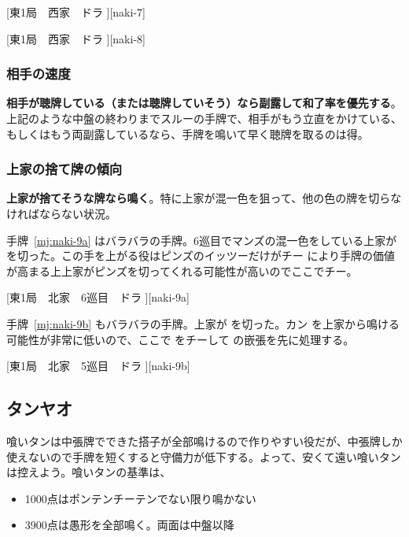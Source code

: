 \documentclass[../nankiru_main.tex]{subfiles}
\begin{document}
[東1局　西家　ドラ ][naki-7]

[東1局　西家　ドラ ][naki-8]


\subsubsection*{相手の速度} 

\textbf{相手が聴牌している（または聴牌していそう）なら副露して和了率を優先する}\citep[][p.~153]{hirasawa-naki}。上記のような中盤の終わりまでスルーの手牌で、相手がもう立直をかけている、もしくはもう両副露しているなら、手牌を鳴いて早く聴牌を取るのは得。


\subsubsection*{上家の捨て牌の傾向} 

\textbf{上家が捨てそうな牌なら鳴く}\citep[][p.~158]{hirasawa-naki}。特に上家が混一色を狙って、他の色の牌を切らなければならない状況。

手牌~\ref{mj:naki-9a} はバラバラの手牌。6巡目でマンズの混一色をしている上家が  を切った。この手を上がる役はピンズのイッツーだけがチー  により手牌の価値が高まる上上家がピンズを切ってくれる可能性が高いのでここでチー。

[東1局　北家　6巡目　ドラ ][naki-9a]

手牌~\ref{mj:naki-9b} もバラバラの手牌。上家が  を切った。カン  を上家から鳴ける可能性が非常に低いので、ここで  をチーして  の嵌張を先に処理する。

[東1局　北家　5巡目　ドラ ][naki-9b]


\subsection{タンヤオ}

喰いタンは中張牌でできた搭子が全部鳴けるので作りやすい役だが、中張牌しか使えないので手牌を短くすると守備力が低下する。よって、安くて遠い喰いタンは控えよう。喰いタンの基準は、

\begin{itemize}
\item 1000点はポンテンチーテンでない限り鳴かない
\item 3900点は愚形を全部鳴く。両面は中盤以降
\end{itemize}
\end{document}
